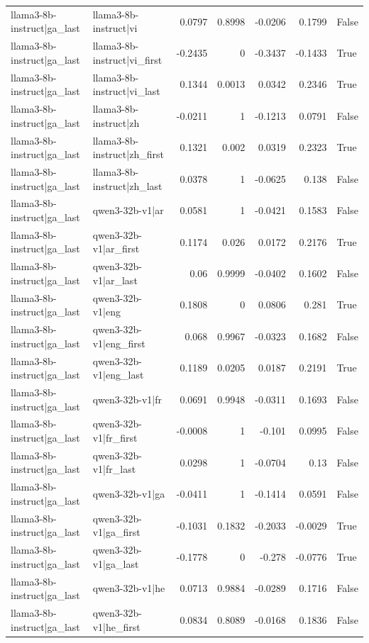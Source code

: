 \begin{table}
\begin{tabular}{l l r r r r l}
llama3-8b-instruct|ga_last & llama3-8b-instruct|vi & 0.0797 & 0.8998 & -0.0206 & 0.1799 & False \\
llama3-8b-instruct|ga_last & llama3-8b-instruct|vi_first & -0.2435 & 0 & -0.3437 & -0.1433 & True \\
llama3-8b-instruct|ga_last & llama3-8b-instruct|vi_last & 0.1344 & 0.0013 & 0.0342 & 0.2346 & True \\
llama3-8b-instruct|ga_last & llama3-8b-instruct|zh & -0.0211 & 1 & -0.1213 & 0.0791 & False \\
llama3-8b-instruct|ga_last & llama3-8b-instruct|zh_first & 0.1321 & 0.002 & 0.0319 & 0.2323 & True \\
llama3-8b-instruct|ga_last & llama3-8b-instruct|zh_last & 0.0378 & 1 & -0.0625 & 0.138 & False \\
llama3-8b-instruct|ga_last & qwen3-32b-v1|ar & 0.0581 & 1 & -0.0421 & 0.1583 & False \\
llama3-8b-instruct|ga_last & qwen3-32b-v1|ar_first & 0.1174 & 0.026 & 0.0172 & 0.2176 & True \\
llama3-8b-instruct|ga_last & qwen3-32b-v1|ar_last & 0.06 & 0.9999 & -0.0402 & 0.1602 & False \\
llama3-8b-instruct|ga_last & qwen3-32b-v1|eng & 0.1808 & 0 & 0.0806 & 0.281 & True \\
llama3-8b-instruct|ga_last & qwen3-32b-v1|eng_first & 0.068 & 0.9967 & -0.0323 & 0.1682 & False \\
llama3-8b-instruct|ga_last & qwen3-32b-v1|eng_last & 0.1189 & 0.0205 & 0.0187 & 0.2191 & True \\
llama3-8b-instruct|ga_last & qwen3-32b-v1|fr & 0.0691 & 0.9948 & -0.0311 & 0.1693 & False \\
llama3-8b-instruct|ga_last & qwen3-32b-v1|fr_first & -0.0008 & 1 & -0.101 & 0.0995 & False \\
llama3-8b-instruct|ga_last & qwen3-32b-v1|fr_last & 0.0298 & 1 & -0.0704 & 0.13 & False \\
llama3-8b-instruct|ga_last & qwen3-32b-v1|ga & -0.0411 & 1 & -0.1414 & 0.0591 & False \\
llama3-8b-instruct|ga_last & qwen3-32b-v1|ga_first & -0.1031 & 0.1832 & -0.2033 & -0.0029 & True \\
llama3-8b-instruct|ga_last & qwen3-32b-v1|ga_last & -0.1778 & 0 & -0.278 & -0.0776 & True \\
llama3-8b-instruct|ga_last & qwen3-32b-v1|he & 0.0713 & 0.9884 & -0.0289 & 0.1716 & False \\
llama3-8b-instruct|ga_last & qwen3-32b-v1|he_first & 0.0834 & 0.8089 & -0.0168 & 0.1836 & False \\

\end{tabular}
\end{table}
